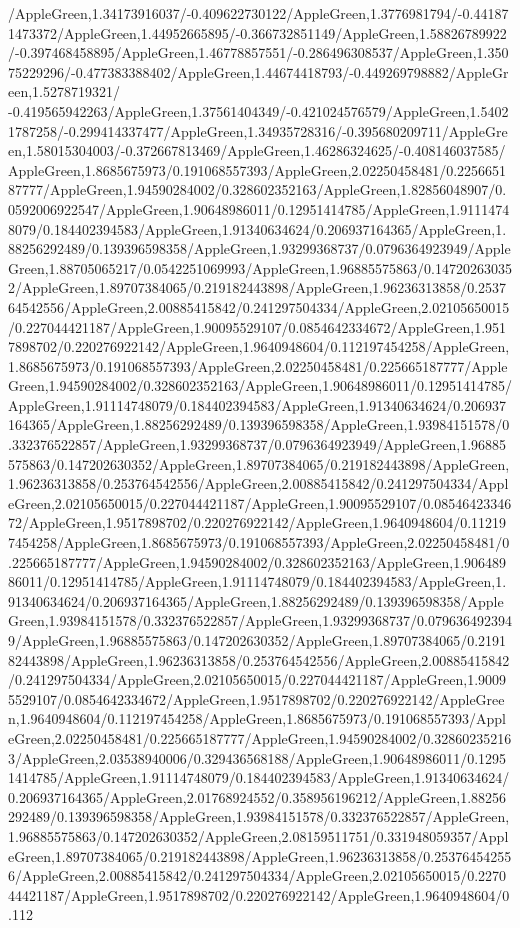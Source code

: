 {\begin{tikzternal}
{/AppleGreen,1.34173916037/-0.409622730122/AppleGreen,1.3776981794/-0.441871473372/AppleGreen,1.44952665895/-0.366732851149/AppleGreen,1.58826789922/-0.397468458895/AppleGreen,1.46778857551/-0.286496308537/AppleGreen,1.35075229296/-0.477383388402/AppleGreen,1.44674418793/-0.449269798882/AppleGreen,1.5278719321/
-0.419565942263/AppleGreen,1.37561404349/-0.421024576579/AppleGreen,1.54021787258/-0.299414337477/AppleGreen,1.34935728316/-0.395680209711/AppleGreen,1.58015304003/-0.372667813469/AppleGreen,1.46286324625/-0.408146037585/AppleGreen,1.8685675973/0.191068557393/AppleGreen,2.02250458481/0.225665187777/AppleGreen,1.94590284002/0.328602352163/AppleGreen,1.82856048907/0.0592006922547/AppleGreen,1.90648986011/0.12951414785/AppleGreen,1.91114748079/0.184402394583/AppleGreen,1.91340634624/0.206937164365/AppleGreen,1.88256292489/0.139396598358/AppleGreen,1.93299368737/0.0796364923949/AppleGreen,1.88705065217/0.0542251069993/AppleGreen,1.96885575863/0.147202630352/AppleGreen,1.89707384065/0.219182443898/AppleGreen,1.96236313858/0.253764542556/AppleGreen,2.00885415842/0.241297504334/AppleGreen,2.02105650015/0.227044421187/AppleGreen,1.90095529107/0.0854642334672/AppleGreen,1.9517898702/0.220276922142/AppleGreen,1.9640948604/0.112197454258/AppleGreen,1.8685675973/0.191068557393/AppleGreen,2.02250458481/0.225665187777/AppleGreen,1.94590284002/0.328602352163/AppleGreen,1.90648986011/0.12951414785/AppleGreen,1.91114748079/0.184402394583/AppleGreen,1.91340634624/0.206937164365/AppleGreen,1.88256292489/0.139396598358/AppleGreen,1.93984151578/0.332376522857/AppleGreen,1.93299368737/0.0796364923949/AppleGreen,1.96885575863/0.147202630352/AppleGreen,1.89707384065/0.219182443898/AppleGreen,1.96236313858/0.253764542556/AppleGreen,2.00885415842/0.241297504334/AppleGreen,2.02105650015/0.227044421187/AppleGreen,1.90095529107/0.0854642334672/AppleGreen,1.9517898702/0.220276922142/AppleGreen,1.9640948604/0.112197454258/AppleGreen,1.8685675973/0.191068557393/AppleGreen,2.02250458481/0.225665187777/AppleGreen,1.94590284002/0.328602352163/AppleGreen,1.90648986011/0.12951414785/AppleGreen,1.91114748079/0.184402394583/AppleGreen,1.91340634624/0.206937164365/AppleGreen,1.88256292489/0.139396598358/AppleGreen,1.93984151578/0.332376522857/AppleGreen,1.93299368737/0.0796364923949/AppleGreen,1.96885575863/0.147202630352/AppleGreen,1.89707384065/0.219182443898/AppleGreen,1.96236313858/0.253764542556/AppleGreen,2.00885415842/0.241297504334/AppleGreen,2.02105650015/0.227044421187/AppleGreen,1.90095529107/0.0854642334672/AppleGreen,1.9517898702/0.220276922142/AppleGreen,1.9640948604/0.112197454258/AppleGreen,1.8685675973/0.191068557393/AppleGreen,2.02250458481/0.225665187777/AppleGreen,1.94590284002/0.328602352163/AppleGreen,2.03538940006/0.329436568188/AppleGreen,1.90648986011/0.12951414785/AppleGreen,1.91114748079/0.184402394583/AppleGreen,1.91340634624/0.206937164365/AppleGreen,2.01768924552/0.358956196212/AppleGreen,1.88256292489/0.139396598358/AppleGreen,1.93984151578/0.332376522857/AppleGreen,1.96885575863/0.147202630352/AppleGreen,2.08159511751/0.331948059357/AppleGreen,1.89707384065/0.219182443898/AppleGreen,1.96236313858/0.253764542556/AppleGreen,2.00885415842/0.241297504334/AppleGreen,2.02105650015/0.227044421187/AppleGreen,1.9517898702/0.220276922142/AppleGreen,1.9640948604/0.112}
\end{tikzternal}}
